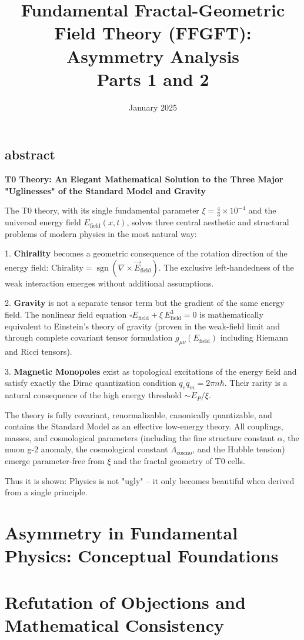 \documentclass[11pt,oneside]{book}
\title{Fundamental Fractal-Geometric Field Theory (FFGFT): Asymmetry Analysis\\[0.5em]
\large Parts 1 and 2}
\author{}
\date{January 2025}
\begin{document}
\frontmatter
\pagestyle{empty}
	\section{abstract}
	\noindent\textbf{T0 Theory: An Elegant Mathematical Solution to the Three Major "Uglinesses" of the Standard Model and Gravity}
	
	The T0 theory, with its single fundamental parameter $\xi = \frac{4}{3} \times 10^{-4}$ and the universal energy field $E_{\text{field}}(x,t)$, solves three central aesthetic and structural problems of modern physics in the most natural way:
	
	1. \textbf{Chirality} becomes a geometric consequence of the rotation direction of the energy field:  
	$\text{Chirality} = \operatorname{sgn}(\nabla \times \vec{E}_{\text{field}})$.  
	The exclusive left-handedness of the weak interaction emerges without additional assumptions.
	
	2. \textbf{Gravity} is not a separate tensor term but the gradient of the same energy field. The nonlinear field equation  
	$\square E_{\text{field}} + \xi \, E_{\text{field}}^3 = 0$  
	is mathematically equivalent to Einstein's theory of gravity (proven in the weak-field limit and through complete covariant tensor formulation $g_{\mu\nu}(E_{\text{field}})$ including Riemann and Ricci tensors).
	
	3. \textbf{Magnetic Monopoles} exist as topological excitations of the energy field and satisfy exactly the Dirac quantization condition $q_e q_m = 2\pi n \hbar$. Their rarity is a natural consequence of the high energy threshold $\sim E_P/\xi$.
	
	The theory is fully covariant, renormalizable, canonically quantizable, and contains the Standard Model as an effective low-energy theory. All couplings, masses, and cosmological parameters (including the fine structure constant $\alpha$, the muon g-2 anomaly, the cosmological constant $\Lambda_{\text{cosmo}}$, and the Hubble tension) emerge parameter-free from $\xi$ and the fractal geometry of T0 cells.
	
	Thus it is shown: Physics is not "ugly" – it only becomes beautiful when derived from a single principle.

\maketitle

\tableofcontents

\mainmatter
\pagestyle{plain}

\chapter{Asymmetry in Fundamental Physics: Conceptual Foundations}


\chapter{Refutation of Objections and Mathematical Consistency}

\end{document}
